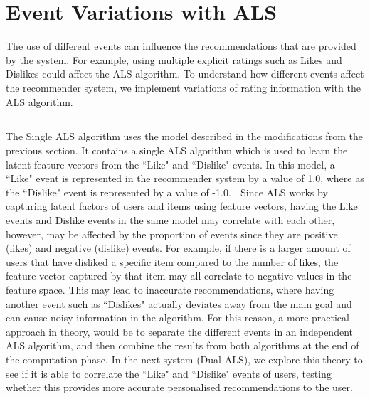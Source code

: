 \section{Event Variations with ALS} \label{algorithms}

The use of different events can influence the recommendations that are provided by the system. For example, using multiple explicit ratings such as Likes and Dislikes could affect the ALS algorithm. To understand how different events affect the recommender system, we implement variations of rating information with the ALS algorithm.

\subsubsection{}

\subsubsection{}

\subsection{}


The Single ALS algorithm uses the model described in the modifications from the previous section. It contains a single ALS algorithm which is used to learn the latent feature vectors from the ``Like" and ``Dislike" events. In this model, a ``Like" event is represented in the recommender system by a value of 1.0, where as the ``Dislike" event is represented by a value of -1.0. . Since ALS works by capturing latent factors of users and items using feature vectors, having the Like events and Dislike events in the same model may correlate with each other, however, may be affected by the proportion of events since they are positive (likes) and negative (dislike) events. For example, if there is a larger amount of users that have disliked a specific item compared to the number of likes, the feature vector captured by that item may all correlate to negative values in the feature space. This may lead to inaccurate recommendations, where having another event such as ``Dislikes" actually deviates away from the main goal and can cause noisy information in the algorithm. For this reason, a more practical approach in theory, would be to separate the different events in an independent ALS algorithm, and then combine the results from both algorithms at the end of the computation phase. In the next system (Dual ALS), we explore this theory to see if it is able to correlate the ``Like" and ``Dislike" events of users, testing whether this provides more accurate personalised recommendations to the user. 

